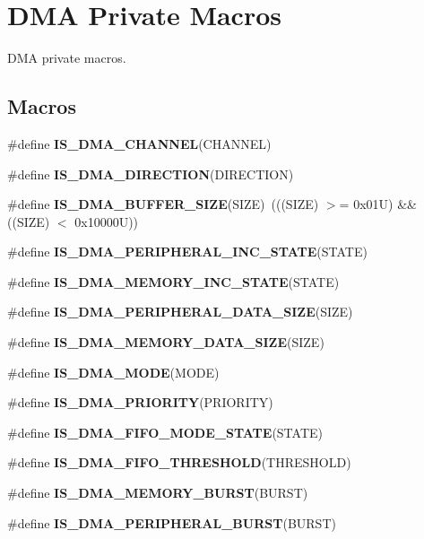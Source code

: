 \hypertarget{group___d_m_a___private___macros}{}\section{D\+MA Private Macros}
\label{group___d_m_a___private___macros}


D\+MA private macros.  


\subsection*{Macros}
\begin{DoxyCompactItemize}
\item 
\#define {\bfseries I\+S\+\_\+\+D\+M\+A\+\_\+\+C\+H\+A\+N\+N\+EL}(C\+H\+A\+N\+N\+EL)
\item 
\#define {\bfseries I\+S\+\_\+\+D\+M\+A\+\_\+\+D\+I\+R\+E\+C\+T\+I\+ON}(D\+I\+R\+E\+C\+T\+I\+ON)
\item 
\mbox{\label{group___d_m_a___private___macros_ga72ef4033bb3bc2cdfdbe579083b05e32}} 
\#define {\bfseries I\+S\+\_\+\+D\+M\+A\+\_\+\+B\+U\+F\+F\+E\+R\+\_\+\+S\+I\+ZE}(S\+I\+ZE)~(((S\+I\+ZE) $>$= 0x01\+U) \&\& ((\+S\+I\+Z\+E) $<$ 0x10000\+U))
\item 
\#define {\bfseries I\+S\+\_\+\+D\+M\+A\+\_\+\+P\+E\+R\+I\+P\+H\+E\+R\+A\+L\+\_\+\+I\+N\+C\+\_\+\+S\+T\+A\+TE}(S\+T\+A\+TE)
\item 
\#define {\bfseries I\+S\+\_\+\+D\+M\+A\+\_\+\+M\+E\+M\+O\+R\+Y\+\_\+\+I\+N\+C\+\_\+\+S\+T\+A\+TE}(S\+T\+A\+TE)
\item 
\#define {\bfseries I\+S\+\_\+\+D\+M\+A\+\_\+\+P\+E\+R\+I\+P\+H\+E\+R\+A\+L\+\_\+\+D\+A\+T\+A\+\_\+\+S\+I\+ZE}(S\+I\+ZE)
\item 
\#define {\bfseries I\+S\+\_\+\+D\+M\+A\+\_\+\+M\+E\+M\+O\+R\+Y\+\_\+\+D\+A\+T\+A\+\_\+\+S\+I\+ZE}(S\+I\+ZE)
\item 
\#define {\bfseries I\+S\+\_\+\+D\+M\+A\+\_\+\+M\+O\+DE}(M\+O\+DE)
\item 
\#define {\bfseries I\+S\+\_\+\+D\+M\+A\+\_\+\+P\+R\+I\+O\+R\+I\+TY}(P\+R\+I\+O\+R\+I\+TY)
\item 
\#define {\bfseries I\+S\+\_\+\+D\+M\+A\+\_\+\+F\+I\+F\+O\+\_\+\+M\+O\+D\+E\+\_\+\+S\+T\+A\+TE}(S\+T\+A\+TE)
\item 
\#define {\bfseries I\+S\+\_\+\+D\+M\+A\+\_\+\+F\+I\+F\+O\+\_\+\+T\+H\+R\+E\+S\+H\+O\+LD}(T\+H\+R\+E\+S\+H\+O\+LD)
\item 
\#define {\bfseries I\+S\+\_\+\+D\+M\+A\+\_\+\+M\+E\+M\+O\+R\+Y\+\_\+\+B\+U\+R\+ST}(B\+U\+R\+ST)
\item 
\#define {\bfseries I\+S\+\_\+\+D\+M\+A\+\_\+\+P\+E\+R\+I\+P\+H\+E\+R\+A\+L\+\_\+\+B\+U\+R\+ST}(B\+U\+R\+ST)
\end{DoxyCompactItemize}


